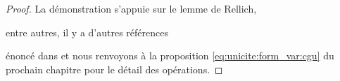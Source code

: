     \begin{proof}
      La démonstration s'appuie sur le lemme de Rellich,
      \begin{REM}
    entre autres, il y a d'autres références
\end{REM} énoncé dans \cite[p.~74]{cessenat_mathematical_1996} et nous renvoyons à la proposition \ref{eq:unicite:form_var:cgu} du prochain chapitre pour le détail des opérations.


      
      
    
    \end{proof}      

